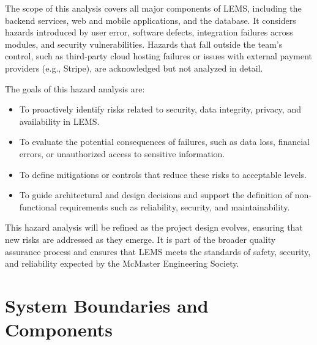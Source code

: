 \documentclass{article}
\begin{document}
\par
\vspace{1em}

The scope of this analysis covers all major components of LEMS, including the backend services, 
web and mobile applications, and the database. It considers hazards introduced by user error, software 
defects, integration failures across modules, and security vulnerabilities. Hazards that fall outside the 
team’s control, such as third-party cloud hosting failures or issues with external payment providers 
(e.g., Stripe), are acknowledged but not analyzed in detail.

\par
\vspace{1em}

The goals of this hazard analysis are:
\begin{itemize}
  \item To proactively identify risks related to security, data integrity, privacy, and availability in LEMS.
  \item To evaluate the potential consequences of failures, such as data loss, financial errors, or 
        unauthorized access to sensitive information.
  \item To define mitigations or controls that reduce these risks to acceptable levels.
  \item To guide architectural and design decisions and support the definition of non-functional 
        requirements such as reliability, security, and maintainability.
\end{itemize}

This hazard analysis will be refined as the project design evolves, ensuring that new risks are 
addressed as they emerge. It is part of the broader quality assurance process and ensures that LEMS 
meets the standards of safety, security, and reliability expected by the McMaster Engineering Society.

\section{System Boundaries and Components}

\end{document}
